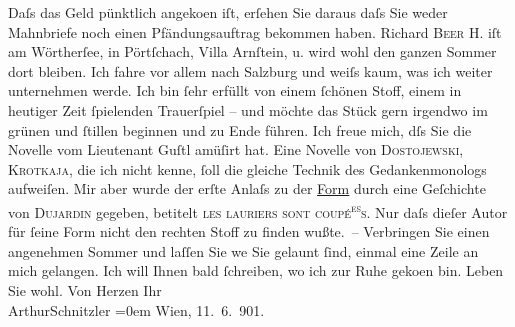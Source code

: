 \begin{ledgroupsized}[t]{13cm}
               Daſs das Geld pünktlich angeko{\geminationm}en iſt, erſehen Sie
               daraus {\pb}daſs Sie weder Mahnbriefe noch einen
               Pfändungsauftrag bekommen haben. Richard \textsc{Beer H.} iſt am Wörtherſee, in Pörtſchach, Villa Arnſtein, u. wird wohl den ganzen Sommer dort
               bleiben. Ich fahre vor allem nach Salzburg und
               weiſs kaum, was ich weiter unternehmen werde. Ich bin ſehr erfüllt von einem ſchönen
               Stoff, einem in heutiger Zeit ſpielenden {\pb}Trauerſpiel – und möchte das
               Stück gern irgendwo im grünen und ſtillen beginnen und zu Ende führen. Ich freue
               mich, dſs Sie die Novelle vom Lieutenant Guſtl
               amüſirt hat. Eine Novelle von \textsc{Dostojewski}, \textsc{Krotkaja}, die ich nicht kenne, ſoll die gleiche Technik des Gedankenmonologs aufweiſen.
               Mir aber wurde der erſte Anlaſs zu der \uline{Form} durch
               eine Geſchichte {\pb}von \textsc{Dujardin} gegeben, betitelt \textsc{les lauriers sont coupé}\substVorne{}\textsuperscript{\textsc{es}}\substDazwischen{}\textsc{s}\substHinten{}. Nur daſs dieſer Autor für ſeine Form nicht den rechten Stoff zu finden
               wußte. –\pend
           \pstart
           Verbringen Sie einen angenehmen Sommer und laſſen Sie we{\geminationn}{ }Sie gelaunt ſind, einmal eine Zeile an mich
               gelangen. Ich will Ihnen bald ſchreiben, wo ich zur Ruhe geko{\geminationm}en {\pb}bin. Leben Sie
               wohl. Von Herzen\pend
           \pstart
           Ihr{\\[\baselineskip]}\spacefill\mbox{ArthurSchnitzler}\pend
           \leftskip=0em{}\pstart
           Wien, 11. 6. 901.\pend
           

\end{ledgroupsized}
